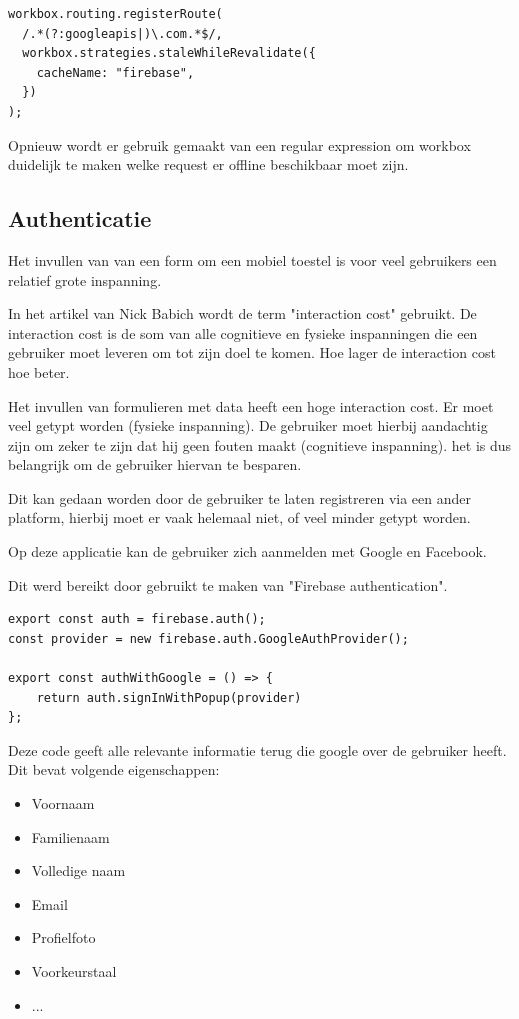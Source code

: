 \begin{lstlisting}
workbox.routing.registerRoute(
  /.*(?:googleapis|)\.com.*$/,
  workbox.strategies.staleWhileRevalidate({
    cacheName: "firebase",
  })
);
\end{lstlisting}
		
		Opnieuw wordt er gebruik gemaakt van een regular expression om workbox duidelijk te maken welke request er offline beschikbaar moet zijn.

	\subsection{Authenticatie}
		
		Het invullen van van een form om een mobiel toestel is voor veel gebruikers een relatief grote inspanning.
		
		In het artikel van Nick Babich wordt de term "interaction cost" gebruikt. De interaction cost is de som van alle cognitieve en fysieke inspanningen die een gebruiker moet leveren om tot zijn doel te komen. Hoe lager de interaction cost hoe beter.
		\autocite{Babich2018}
		
		Het invullen van formulieren met data heeft een hoge interaction cost. Er moet veel getypt worden (fysieke inspanning). De gebruiker moet hierbij aandachtig zijn om zeker te zijn dat hij geen fouten maakt (cognitieve inspanning). het is dus belangrijk om de gebruiker hiervan te besparen.
		
		Dit kan gedaan worden door de gebruiker te laten registreren via een ander platform, hierbij moet er vaak helemaal niet, of veel minder getypt worden.
		
		Op deze applicatie kan de gebruiker zich aanmelden met Google en Facebook.
		
		Dit werd bereikt door gebruikt te maken van "Firebase authentication".
		
		
\begin{lstlisting}
export const auth = firebase.auth();
const provider = new firebase.auth.GoogleAuthProvider();

export const authWithGoogle = () => {
	return auth.signInWithPopup(provider)
};
\end{lstlisting}
	
		Deze code geeft alle relevante informatie terug die google over de gebruiker heeft. Dit bevat volgende eigenschappen:
		\begin{itemize}
			\item Voornaam
			\item Familienaam
			\item Volledige naam
			\item Email
			\item Profielfoto
			\item Voorkeurstaal
			\item ...
		\end{itemize} 
		
